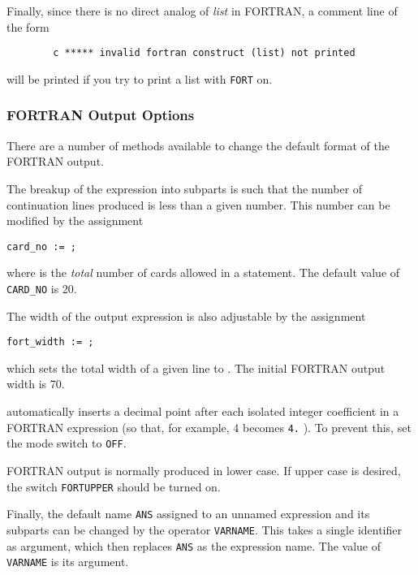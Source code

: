 Finally, since there is no direct analog of {\em list\/} in FORTRAN,
a comment line of the form
\begin{verbatim}
        c ***** invalid fortran construct (list) not printed
\end{verbatim}
will be printed if you try to print a list with \texttt{FORT} on.

\subsubsection{{FORTRAN} Output Options}
\hypertarget{reserved:FORT_WIDTH}{}
\hypertarget{switch:PERIOD}{}
\hypertarget{switch:FORTUPPER}{}

There are a number of methods available to change the default format of the
FORTRAN output.

The breakup of the expression into subparts is such that the number of
continuation lines produced is less than a given number. This number can
be modified by the assignment
\begin{syntax}
  \texttt{card\_no := }\texttt{;}
\end{syntax}
where  is the \emph{total} number of cards allowed in a
statement. The default value of \texttt{CARD\_NO} is 20.

The width of the output expression is also adjustable by the assignment
\begin{syntax}
  \texttt{fort\_width := }\texttt{;}
\end{syntax}
 which sets the total width of a given line to
.  The initial FORTRAN output width is 70.

{\REDUCE} automatically inserts a decimal point after each isolated integer
coefficient in a FORTRAN expression (so that, for example, 4 becomes
\texttt{4.} ). To prevent this, set the 
mode switch to \texttt{OFF}.

FORTRAN output is normally produced in lower case.  If upper case is desired,
the switch \texttt{FORTUPPER} should be turned on.

\hypertarget{operator:VARNAME}{}
Finally, the default name \texttt{ANS} assigned to an unnamed expression and
its subparts can be changed by the operator \texttt{VARNAME}.
  This takes a single identifier as argument, which then
replaces \texttt{ANS} as the expression name.  The value of \texttt{VARNAME} is
its argument.

